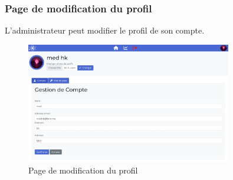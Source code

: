 \documentclass{article}
\begin{document}
                    \subsubsection{Page de modification du profil}
                        L'administrateur peut modifier le profil de son compte.
                        \begin{figure}[h!]
                            \centering
                            \includegraphics[width=0.8\textwidth]{assets/webSite/AdminModif.jpeg}
                            \caption{Page de modification du profil}
                        \end{figure}
                        \FloatBarrier
\end{document}
